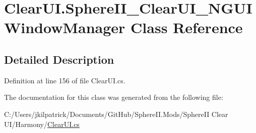 \hypertarget{class_clear_u_i_1_1_sphere_i_i___clear_u_i___n_g_u_i_window_manager}{}\section{Clear\+U\+I.\+Sphere\+I\+I\+\_\+\+Clear\+U\+I\+\_\+\+N\+G\+U\+I\+Window\+Manager Class Reference}
\label{class_clear_u_i_1_1_sphere_i_i___clear_u_i___n_g_u_i_window_manager}


\subsection{Detailed Description}


Definition at line 156 of file Clear\+U\+I.\+cs.



The documentation for this class was generated from the following file\+:\begin{DoxyCompactItemize}
\item 
C\+:/\+Users/jkilpatrick/\+Documents/\+Git\+Hub/\+Sphere\+I\+I.\+Mods/\+Sphere\+I\+I Clear U\+I/\+Harmony/\mbox{\hyperlink{_clear_u_i_8cs}{Clear\+U\+I.\+cs}}\end{DoxyCompactItemize}
